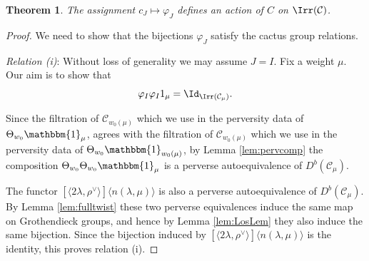 \documentclass[11pt,reqno]{amsart}
\numberwithin{equation}{section}
\newtheorem{Theorem}[equation]{Theorem}
\theoremstyle{definition}
\theoremstyle{named}
\newcommand{\cC}{\mathcal{C}}
\newcommand{\cL}{\mathcal{L}}
\newcommand{\cM}{\mathcal{M}}
\newcommand{\fg}{\mathfrak{g}}
\newcommand{\bone}{\mathbbm{1}}
\begin{document}
\begin{Theorem}\label{thm:cactus}
The assignment $c_J \mapsto \varphi_J$ defines an action of $C$ on $\Irr(\cC)$.
\end{Theorem}

\begin{proof} We need to show that the bijections $\varphi_J$ satisfy the cactus group relations. 
%
%
%
%

\textit{Relation (i)}: Without loss of generality we may assume $J=I$.   Fix a weight $\mu$.  Our aim is to show that 
\begin{equation}
\label{eq:rel1}
\varphi_I \varphi_I1_\mu=\Id_{\Irr(\cC_\mu)}.
\end{equation}


Since the filtration of $\cC_{w_0(\mu)}$ which we use in the perversity data of $\Theta_{w_0}\bone_\mu$, agrees with the filtration of $\cC_{w_0(\mu)}$ which we use in the perversity data of $\Theta_{w_0}\bone_{w_0(\mu)}$, by Lemma \ref{lem:pervcomp} the composition $\Theta_{w_0} \Theta_{w_0}\bone_\mu$ is a perverse autoequivalence of $D^b(\cC_\mu)$. 

The  functor $[\langle 2\lambda ,\rho^\vee \rangle]\langle n(\lambda,\mu)\rangle$ is also a perverse autoequivalence of $D^b(\cC_\mu)$.   By Lemma \ref{lem:fulltwist} these two perverse equivalences induce the same map on Grothendieck groups, and hence by Lemma \ref{lem:LosLem} they also induce the same bijection.  Since the bijection induced by $[\langle 2\lambda ,\rho^\vee \rangle]\langle n(\lambda,\mu)\rangle$ is the identity, this proves  relation (i).




\end{proof}
\end{document}
